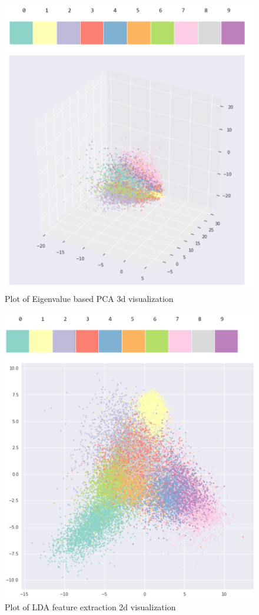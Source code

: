\documentclass[11pt, oneside]{article}
\begin{document}
\begin{figure}[h]
\centering
\includegraphics{./pics/cov_pca_3d.PNG}
\caption{Plot of Eigenvalue based PCA 3d visualization}
\end{figure}

\begin{figure}[h]
\centering
\includegraphics{./pics/cov_lda_2d.PNG}
\caption{Plot of LDA feature extraction 2d visualization}
\end{figure}
\end{document}
